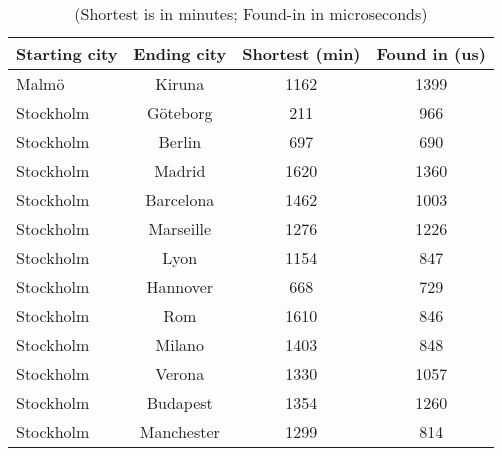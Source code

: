 \documentclass[a4paper,11pt]{article}
\begin{document}
\begin{table}[h]
\begin{center}
\begin{tabular}{l|c|c|c}
\textbf{Starting city} & \textbf{Ending city} & \textbf{Shortest (min)} & \textbf{Found in (us)}\\
\hline
  Malmö      &  Kiruna     &  1162     &  1399\\
  Stockholm      &  Göteborg     &  211     &  966\\
  Stockholm      &  Berlin     &  697     &  690\\
  Stockholm      &  Madrid     &  1620     &  1360\\
  Stockholm      &  Barcelona     &  1462     &  1003\\
  Stockholm      &  Marseille     &  1276     &  1226\\
  Stockholm      &  Lyon     &  1154     &  847\\
  Stockholm      &  Hannover     &  668     &  729\\
  Stockholm      &  Rom     &  1610     &  846\\
  Stockholm      &  Milano     &  1403     &  848\\
  Stockholm      &  Verona     &  1330     &  1057\\
  Stockholm      &  Budapest     &  1354     &  1260\\
  Stockholm      &  Manchester     &  1299     &  814\\
\end{tabular}
\caption{(Shortest is in minutes; Found-in in microseconds)}
\label{tab:table1}
\end{center}
\end{table}
\end{document}
